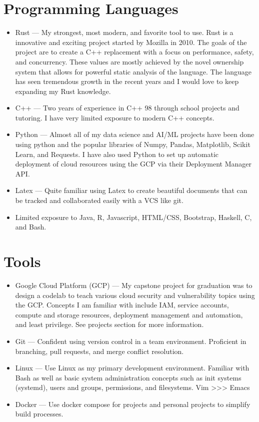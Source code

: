 \documentclass{article}
\begin{document}
\section{Programming Languages}
\begin{itemize}
      \item Rust --- My strongest, most modern, and favorite tool to use. Rust is a innovative and exciting
         project started by Mozilla in 2010. The goals of the project are to create a C++ replacement with a
         focus on performance, safety, and concurrency. These values are mostly achieved by the novel ownership
         system that allows for powerful static analysis of the language. The language has seen tremendous growth
         in the recent years and I would love to keep expanding my Rust knowledge.
      \item C++ --- Two years of experience in C++ 98 through school projects and tutoring. I have very limited
         exposure to modern C++ concepts.
      \item Python --- Almost all of my data science and AI/ML projects have been done using python and the popular
         libraries of Numpy, Pandas, Matplotlib, Scikit Learn, and Requests. I have also used Python to set up automatic
         deployment of cloud resources using the GCP via their Deployment Manager API.
      \item Latex --- Quite familiar using Latex to create beautiful documents that can be tracked and collaborated easily
         with a VCS like git.
      \item Limited exposure to Java, R, Javascript, HTML/CSS, Bootstrap, Haskell, C, and Bash.
\end{itemize}

\section{Tools}
\begin{itemize}
   \item Google Cloud Platform (GCP) --- My capstone project for graduation was to design a codelab to teach various cloud security
      and vulnerability topics using the GCP. Concepts I am familiar with include IAM, service accounts, compute and storage resources,
      deployment management and automation, and least privilege. See projects section for more information.
   \item Git --- Confident using version control in a team environment. Proficient in branching, pull requests, and merge conflict resolution.
   \item Linux --- Use Linux as my primary development environment. Familiar with Bash as well as basic system administration concepts
      such as init systems (systemd), users and groups, permissions, and filesystems. Vim >>> Emacs
   \item Docker --- Use docker compose for projects and personal projects to simplify build processes.
\end{itemize}
\end{document}
